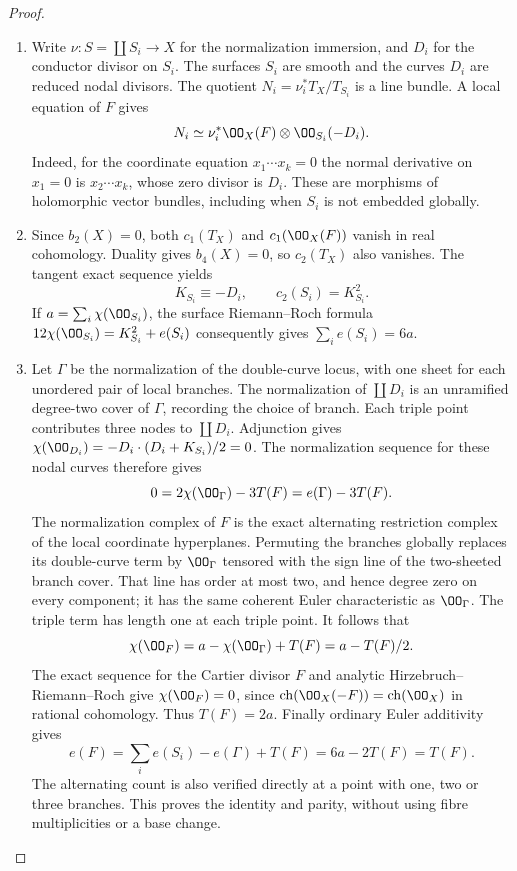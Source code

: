 \begin{proof}

\begin{enumerate}[label={$\langle1\rangle$\arabic*.},leftmargin=*]
\item Write $\nu:S=\coprod S_i\to X$ for the normalization immersion, and $D_i$
for the conductor divisor on $S_i$. The surfaces $S_i$ are smooth and
the curves $D_i$ are reduced nodal divisors. The quotient
$N_i=\nu_i^*T_X/T_{S_i}$ is a line bundle. A local equation of $F$ gives
\[
 N_i\simeq \nu_i^*\OO_X(F)\otimes\OO_{S_i}(-D_i).
\]
Indeed, for the coordinate equation $x_1\cdots x_k=0$ the normal
derivative on $x_1=0$ is $x_2\cdots x_k$, whose zero divisor is $D_i$.
These are morphisms of holomorphic vector bundles, including when
$S_i$ is not embedded globally.

\item Since $b_2(X)=0$, both $c_1(T_X)$ and $c_1(\OO_X(F))$ vanish in real
cohomology. Duality gives $b_4(X)=0$, so $c_2(T_X)$ also vanishes. The
tangent exact sequence yields
\[
 K_{S_i}\equiv-D_i,\qquad c_2(S_i)=K_{S_i}^2.
\]
If $a=\sum_i\chi(\OO_{S_i})$, the surface Riemann--Roch formula
$12\chi(\OO_{S_i})=K_{S_i}^2+e(S_i)$ consequently gives
$\sum_i e(S_i)=6a$.

\item Let $\Gamma$ be the normalization of the double-curve locus, with one
sheet for each unordered pair of local branches. The normalization of
$\coprod D_i$ is an unramified degree-two cover of $\Gamma$, recording
the choice of branch. Each triple point contributes three nodes to
$\coprod D_i$. Adjunction gives
$\chi(\OO_{D_i})=-D_i\cdot(D_i+K_{S_i})/2=0$. The normalization
sequence for these nodal curves therefore gives
\[
 0=2\chi(\OO_\Gamma)-3T(F)=e(\Gamma)-3T(F).
\]
The normalization complex of $F$ is the exact alternating restriction
complex of the local coordinate hyperplanes. Permuting the branches
globally replaces its double-curve term by $\OO_\Gamma$ tensored with
the sign line of the two-sheeted branch cover. That line has order at
most two, and hence degree zero on every component; it has the same
coherent Euler characteristic as $\OO_\Gamma$. The triple term has
length one at each triple point. It follows that
\[
 \chi(\OO_F)=a-\chi(\OO_\Gamma)+T(F)=a-T(F)/2.
\]
The exact sequence for the Cartier divisor $F$ and analytic
Hirzebruch--Riemann--Roch give $\chi(\OO_F)=0$, since
$\operatorname{ch}(\OO_X(-F))=\operatorname{ch}(\OO_X)$ in rational
cohomology. Thus $T(F)=2a$. Finally ordinary Euler additivity gives
\[
 e(F)=\sum_i e(S_i)-e(\Gamma)+T(F)=6a-2T(F)=T(F).
\]
The alternating count is also verified directly at a point with one,
two or three branches. This proves the identity and parity, without
using fibre multiplicities or a base change.

\end{enumerate}
\end{proof}
